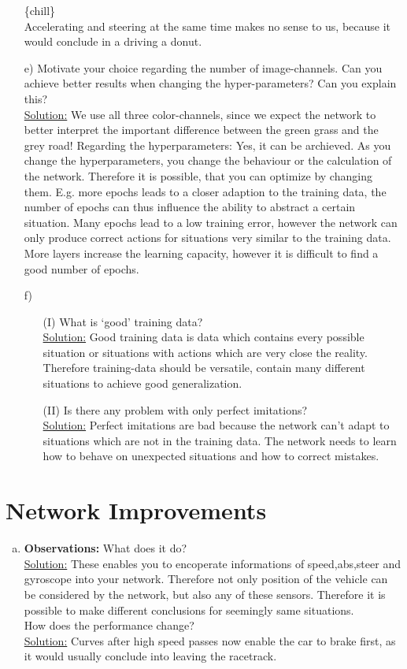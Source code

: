 \documentclass[DIN, pagenumber=false, fontsize=11pt, parskip=half]{scrartcl}
\newcommand{\sol}{\underline{Solution:} }
\begin{document}
\begin{enumerate}[b)]
		\{chill\}\\
		Accelerating and steering at the same time makes no sense to us, because it would conclude in a driving a donut. 
	\item[e)] Motivate your choice regarding the number of image-channels. Can you achieve better results when
	changing the hyper-parameters? Can you explain this?\\\sol
        We use all three color-channels, since we expect the network to better interpret the important difference
        between the green grass and the grey road! Regarding the hyperparameters:
	Yes, it can be archieved. As you change the hyperparameters, you change the behaviour or the calculation of the network.
        Therefore it is possible, that you can optimize by changing them. E.g. more epochs leads to a closer adaption to
        the training data, the number of epochs can thus influence the ability to abstract a certain situation. Many
        epochs lead to a low training error, however the network can only produce correct actions for situations very
        similar to the training data. More layers increase the learning capacity, however it is difficult to find a
       good number of epochs.\\
	\item[f)] \begin{enumerate}
		\item[(I)] What is ‘good’ training data? \\\sol
		Good training data is data which contains every possible situation or situations with actions which are very close the reality.
                Therefore training-data should be versatile, contain many different situations to achieve good
                generalization.
		\item[(II)] Is there any problem with only perfect imitations?\\\sol
		Perfect imitations are bad because the network can't adapt to situations which are not in the training data.
                The network needs to learn how to behave on unexpected situations and how to correct mistakes.
	\end{enumerate}
\end{enumerate}
\section{Network Improvements}
\begin{enumerate}[a)]
	\item \textbf{Observations:} What does it do?\\\sol These enables you to encoperate informations of speed,abs,steer and gyroscope into your network. Therefore not only position of the vehicle can be considered by the network, but also any of these sensors. Therefore it is possible to make different conclusions for seemingly same situations.\\
	
	How does the performance change?
	\\\sol Curves after high speed passes now enable the car to brake first, as it would usually conclude into leaving the racetrack.	
\end{enumerate}
\end{document}
